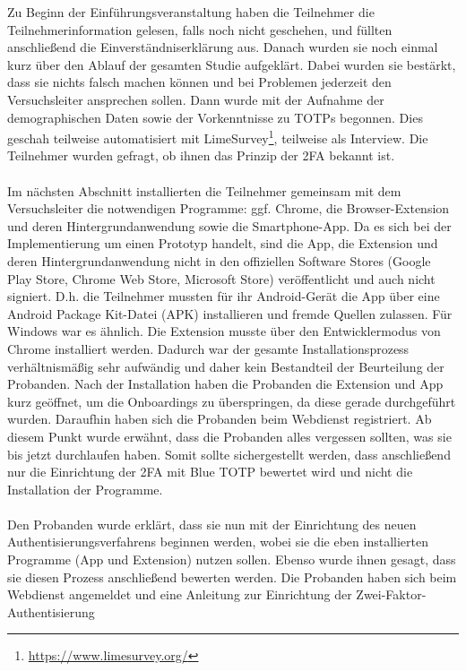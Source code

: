 Zu Beginn der Einführungsveranstaltung haben die Teilnehmer die 
Teilnehmerinformation gelesen, falls noch nicht geschehen, und füllten 
anschließend die Einverständniserklärung aus. Danach wurden sie noch einmal 
kurz über den Ablauf der gesamten Studie aufgeklärt. Dabei wurden sie bestärkt, 
dass sie nichts falsch machen können und bei Problemen jederzeit den 
Versuchsleiter ansprechen sollen. Dann wurde mit der Aufnahme der 
demographischen Daten sowie der Vorkenntnisse zu TOTPs begonnen. Dies geschah 
teilweise automatisiert mit LimeSurvey\footnote{\href{https://www.limesurvey.org/}{https://www.limesurvey.org/}}, teilweise als Interview. Die Teilnehmer wurden 
gefragt, ob ihnen das Prinzip der 2FA bekannt ist.
\\\\
Im nächsten Abschnitt installierten die Teilnehmer gemeinsam mit dem 
Versuchsleiter die notwendigen Programme: ggf. Chrome, die Browser-Extension 
und deren Hintergrundanwendung sowie die Smartphone-App. Da es sich bei der 
Implementierung um einen Prototyp handelt, sind die App, die Extension und 
deren Hintergrundanwendung nicht in den offiziellen Software Stores (Google 
Play Store, Chrome Web Store, Microsoft Store) veröffentlicht und auch nicht 
signiert. D.h. die Teilnehmer mussten für ihr Android-Gerät die App über eine  
\glqq Android Package Kit\grqq-Datei (APK) installieren und fremde Quellen 
zulassen. Für Windows war es ähnlich. Die Extension musste über den 
Entwicklermodus von Chrome installiert werden. Dadurch war der gesamte 
Installationsprozess verhältnismäßig sehr aufwändig und daher kein Bestandteil 
der Beurteilung der Probanden. Nach der Installation haben die Probanden die 
Extension und App kurz geöffnet, um die Onboardings zu überspringen, da diese 
gerade durchgeführt wurden. Daraufhin haben sich die Probanden beim Webdienst 
registriert. Ab diesem Punkt wurde erwähnt, dass die Probanden alles vergessen 
sollten, was sie bis jetzt durchlaufen haben. Somit sollte sichergestellt werden, dass anschließend nur die Einrichtung der 2FA mit Blue TOTP bewertet wird und nicht die Installation der Programme.
\\\\
Den Probanden wurde erklärt, dass sie nun mit der Einrichtung des neuen 
Authentisierungsverfahrens beginnen werden, wobei sie die eben installierten 
Programme (App und Extension) nutzen sollen. Ebenso wurde ihnen gesagt, dass sie diesen Prozess 
anschließend bewerten werden. Die Probanden haben sich beim Webdienst 
angemeldet und eine Anleitung zur Einrichtung der Zwei-Faktor-Authentisierung 
